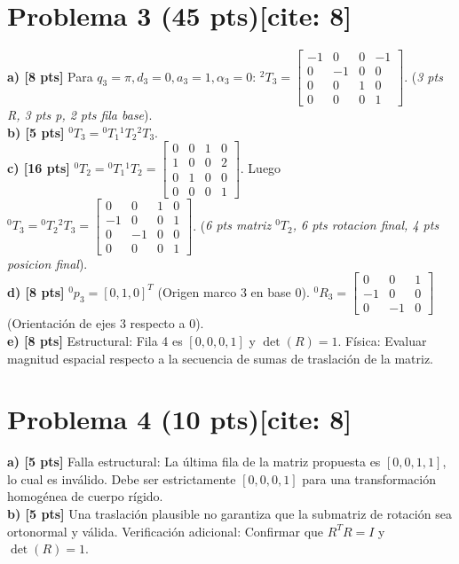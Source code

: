 \documentclass[11pt, a4paper]{article}
\begin{document}
\section*{Problema 3 (45 pts)[cite: 8]}
\textbf{a) [8 pts]} Para $q_3=\pi, d_3=0, a_3=1, \alpha_3=0$: ${}^{2}T_3 = \begin{bmatrix} -1&0&0&-1 \\ 0&-1&0&0 \\ 0&0&1&0 \\ 0&0&0&1 \end{bmatrix}$. (\textit{3 pts R, 3 pts p, 2 pts fila base}). \\
\textbf{b) [5 pts]} ${}^{0}T_3 = {}^{0}T_1 {}^{1}T_2 {}^{2}T_3$.\\
\textbf{c) [16 pts]} ${}^{0}T_2 = {}^{0}T_1 {}^{1}T_2 = \begin{bmatrix} 0&0&1&0 \\ 1&0&0&2 \\ 0&1&0&0 \\ 0&0&0&1 \end{bmatrix}$. Luego ${}^{0}T_3 = {}^{0}T_2 {}^{2}T_3 = \begin{bmatrix} 0&0&1&0 \\ -1&0&0&1 \\ 0&-1&0&0 \\ 0&0&0&1 \end{bmatrix}$. (\textit{6 pts matriz ${}^0T_2$, 6 pts rotacion final, 4 pts posicion final}).\\
\textbf{d) [8 pts]} ${}^{0}p_3 = [0, 1, 0]^T$ (Origen marco 3 en base 0). ${}^{0}R_3 = \begin{bmatrix} 0&0&1 \\ -1&0&0 \\ 0&-1&0 \end{bmatrix}$ (Orientación de ejes 3 respecto a 0).\\
\textbf{e) [8 pts]} Estructural: Fila 4 es $[0,0,0,1]$ y $\det(R)=1$. Física: Evaluar magnitud espacial respecto a la secuencia de sumas de traslación de la matriz.

\section*{Problema 4 (10 pts)[cite: 8]}
\textbf{a) [5 pts]} Falla estructural: La última fila de la matriz propuesta es $[0, 0, 1, 1]$, lo cual es inválido. Debe ser estrictamente $[0, 0, 0, 1]$ para una transformación homogénea de cuerpo rígido.\\
\textbf{b) [5 pts]} Una traslación plausible no garantiza que la submatriz de rotación sea ortonormal y válida. Verificación adicional: Confirmar que $R^T R = I$ y $\det(R) = 1$.
\end{document}
